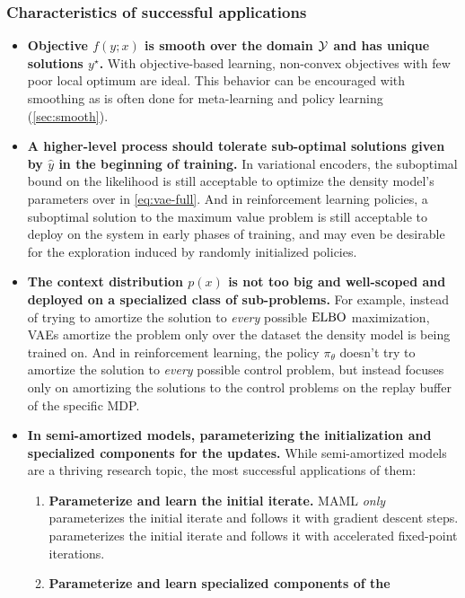 \documentclass[twoside,11pt]{article}
\begin{document}
\subsubsection{Characteristics of successful applications}
\begin{itemize}
\item \textbf{Objective $f(y; x)$ is smooth over the domain ${\mathcal{Y}}$
  and has unique solutions $y^\star$.}
  With objective-based learning, non-convex objectives with
  few poor local optimum are ideal.
  This behavior can be encouraged with smoothing as is
  often done for meta-learning and policy learning (\cref{sec:smooth}).
\item \textbf{A higher-level process should tolerate sub-optimal
  solutions given by $\hat y$ in the beginning of training.}
  In variational encoders, the suboptimal bound on the likelihood
  is still acceptable to optimize the density model's parameters over
  in \cref{eq:vae-full}.
  And in reinforcement learning policies,
  a suboptimal solution to the maximum value problem is still
  acceptable to deploy on the system in early phases of training,
  and may even be desirable for the exploration induced by randomly
  initialized policies.
\item \textbf{The context distribution $p(x)$ is not too big and
  well-scoped and deployed on a specialized class of sub-problems.}
  For example, instead of trying to amortize the solution to
  \emph{every} possible $\operatorname{ELBO}$ maximization, VAEs
  amortize the problem only over the dataset the density
  model is being trained on.
  And in reinforcement learning, the policy $\pi_\theta$ doesn't
  try to amortize the solution to \emph{every} possible control
  problem, but instead focuses only on amortizing the solutions
  to the control problems on the replay buffer of the
  specific MDP.
\item \textbf{In semi-amortized models, parameterizing the initialization
    and specialized components for the updates.}
  While semi-amortized models are a thriving research topic,
  the most successful applications of them:
  \begin{enumerate}
  \item \textbf{Parameterize and learn the initial iterate.}
    MAML \citep{finn2017model} \emph{only} parameterizes the initial
    iterate and follows it with gradient descent steps.
    \citet{bai2022neural} parameterizes
    the initial iterate and follows it with accelerated
    fixed-point iterations.
  \item \textbf{Parameterize and learn specialized components of the
}
\end{enumerate}
\end{itemize}
\end{document}
